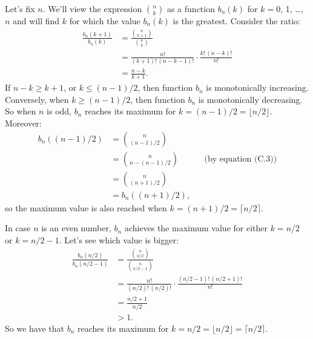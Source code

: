 Let's fix $n$.
We'll view the expression $\binom{n}{k}$ as a function $b_n(k)$ for $k=0$, 1, \dots, $n$ and will find $k$ for which the value $b_n(k)$ is the greatest.
Consider the ratio:
\begin{align*}
    \frac{b_n(k+1)}{b_n(k)} &= \frac{\binom{n}{k+1}}{\binom{n}{k}} \\
    &= \frac{n!}{(k+1)!\,(n-k-1)!}\cdot\frac{k!\,(n-k)!}{n!} \\[1mm]
    &= \frac{n-k}{k+1}.
\end{align*}
If $n-k\ge k+1$, or $k\le(n-1)/2$, then function $b_n$ is monotonically increasing.
Conversely, when $k\ge(n-1)/2$, then function $b_n$ is monotonically decreasing.
So when $n$ is odd, $b_n$ reaches its maximum for $k=(n-1)/2=\lfloor n/2\rfloor$.
Moreover:
\begin{align*}
    b_n((n-1)/2) &= \binom{n}{(n-1)/2} \\
    &= \binom{n}{n-(n-1)/2} && \text{(by equation (C.3))} \\
    &= \binom{n}{(n+1)/2} \\
    &= b_n((n+1)/2),
\end{align*}
so the maximum value is also reached when $k=(n+1)/2=\lceil n/2\rceil$.

In case $n$ is an even number, $b_n$ achieves the maximum value for either $k=n/2$ or $k=n/2-1$.
Let's see which value is bigger:
\begin{align*}
    \frac{b_n(n/2)}{b_n(n/2-1)} &= \frac{\binom{n}{n/2}}{\binom{n}{n/2-1}} \\
    &= \frac{n!}{(n/2)!\,(n/2)!}\cdot\frac{(n/2-1)!\,(n/2+1)!}{n!} \\[2mm]
    &= \frac{n/2+1}{n/2} \\
    &> 1.
\end{align*}
So we have that $b_n$ reaches its maximum for $k=n/2=\lfloor n/2\rfloor=\lceil n/2\rceil$.
